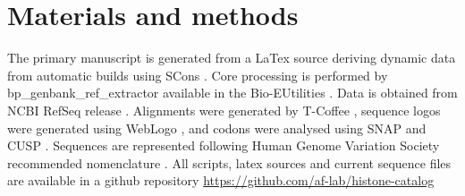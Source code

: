 \section{Materials and methods}
\label{sec:matmethods}

  The primary manuscript is generated from a LaTex source
  deriving dynamic data from automatic builds using SCons  \citep{SCons2005}.
  Core processing is performed by bp\_genbank\_ref\_extractor
  available in the Bio-EUtilities  \citep{BioPerl2002}.
  Data is obtained from NCBI RefSeq release  \citep{PruittRefseq2014}.
  Alignments were generated by T-Coffee   \citep{tcoffee2000},
  sequence logos were generated using WebLogo   \citep{weblogo},
  and codons were analysed using SNAP  \citep{KorberSNAP2000}
  and CUSP  \citep{Emboss2000}.
  Sequences are represented following Human Genome Variation Society recommended nomenclature \citep{mutnomenclature2003}.
  All scripts, latex sources and current sequence files
  are available in a github repository \url{https://github.com/af-lab/histone-catalog}
